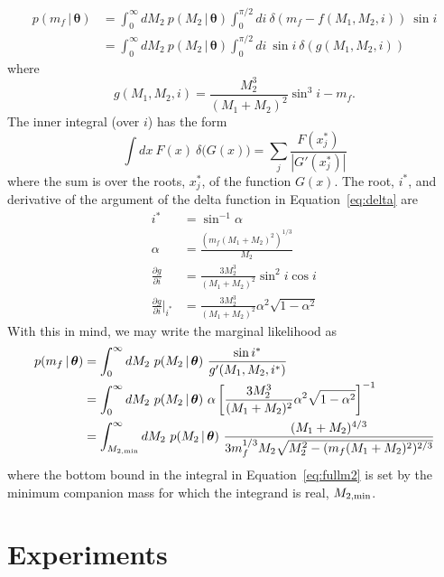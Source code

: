 \documentclass[letterpaper,12pt,preprint]{aastex}
\newcommand{\given}{\,|\,}
\newcommand{\bs}[1]{\boldsymbol{#1}}
\begin{document}
\begin{align}
    p(m_f \given \bs{\theta}) &= \int_{0}^\infty dM_2~p(M_2 \given \bs{\theta}) \int_0^{\pi/2} di ~ \delta(m_f - f(M_1, M_2, i))~\sin i\\
    &= \int_{0}^\infty dM_2~p(M_2 \given \bs{\theta}) \int_0^{\pi/2} di ~\sin i ~ \delta(g(M_1,M_2,i))\label{eq:delta}
\end{align}
where
\begin{equation}
	g(M_1,M_2,i) = \frac{M_2^3}{(M_1+M_2)^2}\sin^3 i - m_f.
\end{equation}
The inner integral (over $i$) has the form
\begin{equation}
    \int dx~F(x)~\delta{(G(x)}) = \sum_j \frac{F(x^*_j)}{|G'(x^*_j)|}
\end{equation}
where the sum is over the roots, $x^*_j$, of the function $G(x)$. The root, $i^*$, and derivative of the argument of the delta function in Equation~\ref{eq:delta} are 
\begin{align}
	i^* &= \sin^{-1}\alpha\\
	\alpha &= \frac{(m_f(M_1+M_2)^2)^{1/3}}{M_2}\\
	\frac{\partial g}{\partial i} &= \frac{3M_2^3}{(M_1+M_2)^2}\sin^2 i \cos i\\
	\frac{\partial g}{\partial i}\bigg\rvert_{i^*} &= \frac{3M_2^3}{(M_1+M_2)^2} \alpha^2 \sqrt{1 - \alpha^2}
\end{align}
With this in mind, we may write the marginal likelihood as
\begin{align}
	p(m_f \given \bs{\theta}) &= \int_{0}^\infty dM_2~p(M_2 \given \bs{\theta})~\frac{\sin i^*}{g'(M_1,M_2,i^*)}\\
	&= \int_{0}^\infty dM_2~p(M_2 \given \bs{\theta})~\alpha\left[\frac{3M_2^3}{(M_1+M_2)^2} \alpha^2 \sqrt{1 - \alpha^2}\right]^{-1}\\
	&= \int_{M_{2,{\rm min}}}^\infty dM_2~p(M_2 \given \bs{\theta})~\frac{(M_1+M_2)^{4/3}}{3m_f^{1/3}M_2\sqrt{M_2^2 - (m_f(M_1+M_2)^2)^{2/3}}}\label{eq:fullm2}
\end{align}
where the bottom bound in the integral in Equation~\ref{eq:fullm2} is set by the minimum companion mass for which the integrand is real, $M_{2,{\rm min}}$.

\section{Experiments} \label{sec:experiments}
\end{document}
